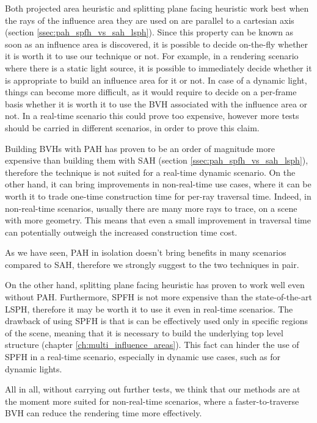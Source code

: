 \documentclass{PoliMi_MasterThesis}
\begin{document}
Both projected area heuristic and splitting plane facing heuristic work best when the rays of the influence area they are used on are parallel to a cartesian axis (section \ref{ssec:pah_spfh_vs_sah_lsph}). Since this property can be known as soon as an influence area is discovered, it is possible to decide on-the-fly whether it is worth it to use our technique or not. For example, in a rendering scenario where there is a static light source, it is possible to immediately decide whether it is appropriate to build an influence area for it or not. In case of a dynamic light, things can become more difficult, as it would require to decide on a per-frame basis whether it is worth it to use the BVH associated with the influence area or not. In a real-time scenario this could prove too expensive, however more tests should be carried in different scenarios, in order to prove this claim.

Building BVHs with PAH has proven to be an order of magnitude more expensive than building them with SAH (section \ref{ssec:pah_spfh_vs_sah_lsph}), therefore the technique is not suited for a real-time dynamic scenario. On the other hand, it can bring improvements in non-real-time use cases, where it can be worth it to trade one-time construction time for per-ray traversal time. Indeed, in non-real-time scenarios, usually there are many more rays to trace, on a scene with more geometry. This means that even a small improvement in traversal time can potentially outweigh the increased construction time cost.

As we have seen, PAH in isolation doesn't bring benefits in many scenarios compared to SAH, therefore we strongly suggest to the two techniques in pair.

On the other hand, splitting plane facing heuristic has proven to work well even without PAH. Furthermore, SPFH is not more expensive than the state-of-the-art LSPH, therefore it may be worth it to use it even in real-time scenarios. The drawback of using SPFH is that is can be effectively used only in specific regions of the scene, meaning that it is necessary to build the underlying top level structure (chapter \ref{ch:multi_influence_areas}). This fact can hinder the use of SPFH in a real-time scenario, especially in dynamic use cases, such as for dynamic lights.

All in all, without carrying out further tests, we think that our methods are at the moment more suited for non-real-time scenarios, where a faster-to-traverse BVH can reduce the rendering time more effectively.
\end{document}
